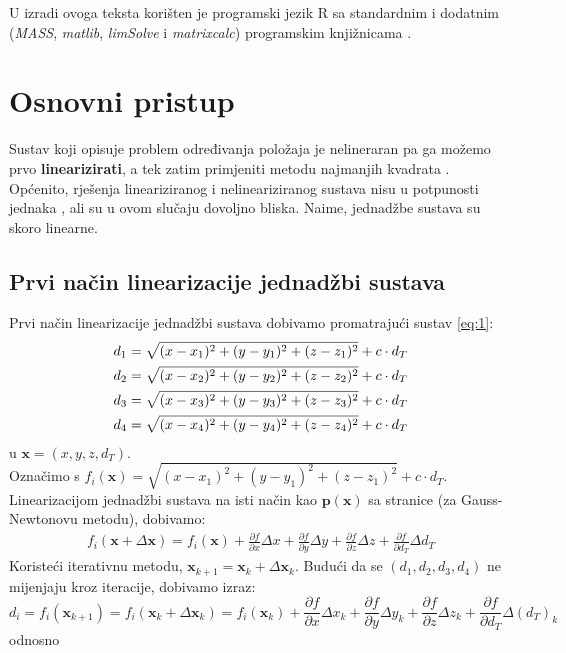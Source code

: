 \documentclass[a4paper,twoside,12pt]{memoir} %
\begin{document}
 U izradi ovoga teksta korišten je programski jezik R sa standardnim i dodatnim (\textit{MASS}, \textit{matlib}, \textit{limSolve} i \textit{matrixcalc}) programskim knjižnicama \cite{ref:4,ref:6,ref:8}.

\section{Osnovni pristup}
Sustav koji opisuje problem određivanja položaja je nelineraran pa
ga možemo prvo \textbf{linearizirati}, a tek zatim primjeniti metodu najmanjih kvadrata \cite{googleSchoolar1}.
Općenito, rješenja lineariziranog i nelineariziranog sustava nisu u potpunosti jednaka \cite{singer07}, ali su u ovom slučaju dovoljno bliska. Naime, jednadžbe sustava su skoro linearne.%

\subsection{Prvi način linearizacije jednadžbi sustava}
Prvi način linearizacije jednadžbi sustava dobivamo promatrajući sustav \ref{eq:1}:
\begin{align}\label{eq:1partial}
d_1 = \sqrt{(x-x_1)^{2}+(y-y_1)^{2}+(z-z_1)^{2}} + c\cdot d_T \notag \\
d_2 = \sqrt{(x-x_2)^{2}+(y-y_2)^{2}+(z-z_2)^{2}} + c\cdot d_T  \\
d_3 = \sqrt{(x-x_3)^{2}+(y-y_3)^{2}+(z-z_3)^{2}} + c\cdot d_T \notag \\
d_4 = \sqrt{(x-x_4)^{2}+(y-y_4)^{2}+(z-z_4)^{2}} + c\cdot d_T \notag
\end{align}
u $\mathbf{x} = (x,y,z,d_T)$.\\
Označimo s $f_i(\mathbf{x}) = \sqrt{(x-x_1)^{2}+(y-y_1)^{2}+(z-z_1)^{2}} + c\cdot d_T$.\\
Linearizacijom jednadžbi sustava na isti način kao $\mathbf{p}(\mathbf{x})$ sa stranice \pageref{stranica:NGLin} (za Gauss-Newtonovu metodu), dobivamo:
\begin{align*}
f_i(\mathbf{x} + \Delta\mathbf{x}) = f_i(\mathbf{x}) + \frac{\partial f}{\partial x}\Delta x + \frac{\partial f}{\partial y}\Delta y + \frac{\partial f}{\partial z}\Delta z + \frac{\partial f}{\partial d_T}\Delta d_T 
\end{align*}
Koristeći iterativnu metodu, $\mathbf{x}_{k+1} = \mathbf{x}_k+\Delta\mathbf{x}_k$.
Budući da se $(d_1,d_2,d_3,d_4)$ ne mijenjaju kroz iteracije, dobivamo izraz:
$$
d_i = f_i(\mathbf{x}_{k+1}) = f_i(\mathbf{x}_{k} + \Delta\mathbf{x}_{k}) = f_i(\mathbf{x}_{k}) + \frac{\partial f}{\partial x}\Delta x_k + \frac{\partial f}{\partial y}\Delta y_k + \frac{\partial f}{\partial z}\Delta z_k + \frac{\partial f}{\partial d_T}\Delta (d_T)_k 
$$odnosno
\end{document}
